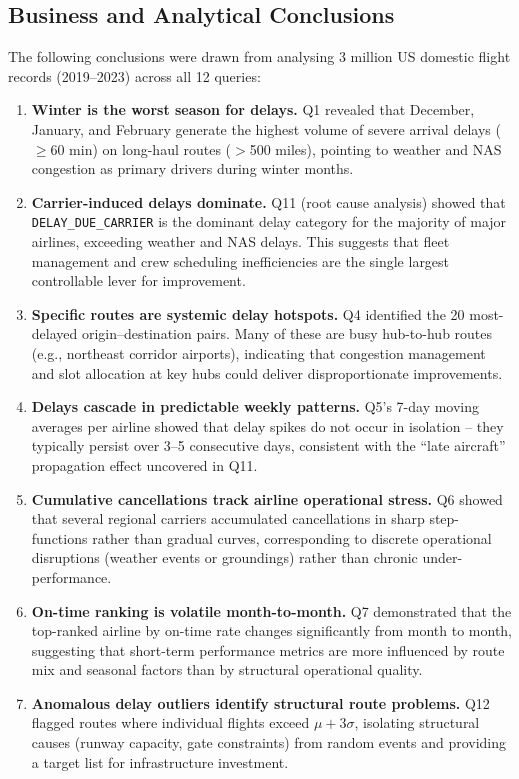 \documentclass{article}
\begin{document}
\subsection{Business and Analytical Conclusions}

The following conclusions were drawn from analysing 3 million US domestic flight records (2019--2023) across all 12 queries:

\begin{enumerate}
    \item \textbf{Winter is the worst season for delays.} Q1 revealed that December, January, and February generate the highest volume of severe arrival delays ($\geq$60 min) on long-haul routes ($>$500 miles), pointing to weather and NAS congestion as primary drivers during winter months.

    \item \textbf{Carrier-induced delays dominate.} Q11 (root cause analysis) showed that \texttt{DELAY\_DUE\_CARRIER} is the dominant delay category for the majority of major airlines, exceeding weather and NAS delays. This suggests that fleet management and crew scheduling inefficiencies are the single largest controllable lever for improvement.

    \item \textbf{Specific routes are systemic delay hotspots.} Q4 identified the 20 most-delayed origin--destination pairs. Many of these are busy hub-to-hub routes (e.g., northeast corridor airports), indicating that congestion management and slot allocation at key hubs could deliver disproportionate improvements.

    \item \textbf{Delays cascade in predictable weekly patterns.} Q5's 7-day moving averages per airline showed that delay spikes do not occur in isolation -- they typically persist over 3--5 consecutive days, consistent with the ``late aircraft'' propagation effect uncovered in Q11.

    \item \textbf{Cumulative cancellations track airline operational stress.} Q6 showed that several regional carriers accumulated cancellations in sharp step-functions rather than gradual curves, corresponding to discrete operational disruptions (weather events or groundings) rather than chronic under-performance.

    \item \textbf{On-time ranking is volatile month-to-month.} Q7 demonstrated that the top-ranked airline by on-time rate changes significantly from month to month, suggesting that short-term performance metrics are more influenced by route mix and seasonal factors than by structural operational quality.

    \item \textbf{Anomalous delay outliers identify structural route problems.} Q12 flagged routes where individual flights exceed $\mu + 3\sigma$, isolating structural causes (runway capacity, gate constraints) from random events and providing a target list for infrastructure investment.
\end{enumerate}
\end{document}
